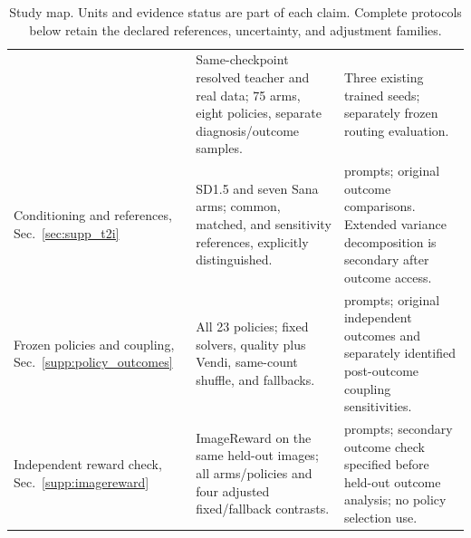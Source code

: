 \begin{table}[t]
\begin{tabular}{>{\raggedright\arraybackslash}p{}>{\raggedright\arraybackslash}p{}>{\raggedright\arraybackslash}p{}}
& Same-checkpoint resolved teacher and real data; 75 arms, eight policies, separate diagnosis/outcome samples.
& Three existing trained seeds; separately frozen routing evaluation. \\
Conditioning and references, Sec.~\ref{sec:supp_t2i}
& 29 SD1.5 and seven Sana arms; common, matched, and sensitivity references, explicitly distinguished.
& 128 prompts; original outcome comparisons. Extended variance decomposition is secondary after outcome access. \\
Frozen policies and coupling, Sec.~\ref{supp:policy_outcomes}
& All 23 policies; fixed solvers, quality plus Vendi, same-count shuffle, and fallbacks.
& 128 prompts; original independent outcomes and separately identified post-outcome coupling sensitivities. \\
Independent reward check, Sec.~\ref{supp:imagereward}
& ImageReward on the same held-out images; all arms/policies and four adjusted fixed/fallback contrasts.
& 128 prompts; secondary outcome check specified before held-out outcome analysis; no policy selection use. \\
\bottomrule
\end{tabular}
\caption{Study map. Units and evidence status are part of each claim. Complete protocols below retain the declared references, uncertainty, and adjustment families.}
\label{tab:supp_study_map}
\end{table}
